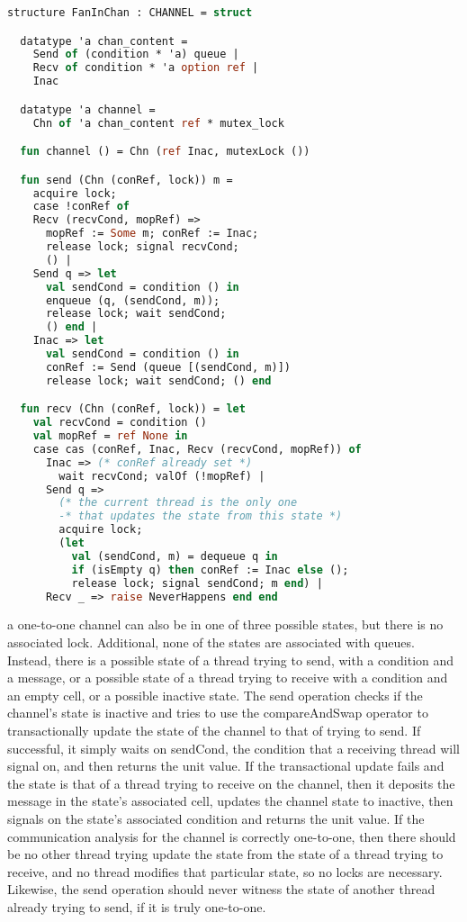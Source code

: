 \documentclass{article}
\begin{document}
\begin{lstlisting}[language=ML, escapechar=\%]
  structure FanInChan : CHANNEL = struct

  datatype 'a chan_content =
    Send of (condition * 'a) queue |
    Recv of condition * 'a option ref |
    Inac

  datatype 'a channel =
    Chn of 'a chan_content ref * mutex_lock

  fun channel () = Chn (ref Inac, mutexLock ())

  fun send (Chn (conRef, lock)) m = 
    acquire lock;
    case !conRef of
    Recv (recvCond, mopRef) => 
      mopRef := Some m; conRef := Inac;
      release lock; signal recvCond;
      () |
    Send q => let
      val sendCond = condition () in
      enqueue (q, (sendCond, m));
      release lock; wait sendCond;
      () end |
    Inac => let
      val sendCond = condition () in
      conRef := Send (queue [(sendCond, m)])
      release lock; wait sendCond; () end 

  fun recv (Chn (conRef, lock)) = let
    val recvCond = condition () 
    val mopRef = ref None in
    case cas (conRef, Inac, Recv (recvCond, mopRef)) of
      Inac => (* conRef already set *)
        wait recvCond; valOf (!mopRef) |
      Send q =>
        (* the current thread is the only one
        -* that updates the state from this state *)
        acquire lock;
        (let
          val (sendCond, m) = dequeue q in
          if (isEmpty q) then conRef := Inac else (); 
          release lock; signal sendCond; m end) |
      Recv _ => raise NeverHappens end end

  \end{lstlisting}

a one-to-one channel can also be in one of three possible states, but there is no associated
lock. Additional, none of the states are associated with queues.  Instead, there is a possible
state of a thread trying to send, with a condition and a message, or a possible state of a
thread trying to receive with a condition and an empty cell, or a possible inactive state.
The send operation checks if the channel's state is inactive and tries to use the
compareAndSwap operator to transactionally update the state of the channel to that of trying to
send.  If successful, it simply waits on sendCond, the condition that a receiving thread will
signal on, and then returns the unit value.  If the transactional update fails and the state is
that of a thread trying to receive on the channel, then it deposits the message in the state's
associated cell, updates the channel state to inactive, then signals on the state's associated
condition and returns the unit value.  If the communication analysis for the channel is
correctly one-to-one, then there should be no other thread trying update the state from the
state of a thread trying to receive, and no thread modifies that particular state, so no locks
are necessary.  Likewise, the send operation should never witness the state of another thread
already trying to send, if it is truly one-to-one.
\end{document}

